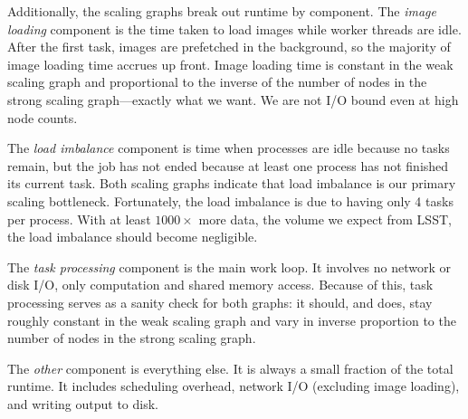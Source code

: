Additionally, the scaling graphs break out runtime by component.
The \textit{image loading} component is the time taken to load images while worker threads
are idle. After the first task, images are prefetched in the background, so the majority of image loading time accrues up front.
Image loading time is constant in the weak scaling graph and proportional to the inverse of the number of nodes in the strong scaling graph---exactly what we want. We are not I/O bound even at high node counts.

The \textit{load imbalance} component is time when processes are idle because no tasks remain, but the job has not ended because at least one process has not finished its current task.
Both scaling graphs indicate that load imbalance is our primary scaling bottleneck.
Fortunately, the load imbalance is due to having only 4 tasks per process.
With at least $1000\times$ more data, the volume we expect from LSST, the load imbalance should become negligible.

The \textit{task processing} component is the main work loop.
It involves no network or disk I/O, only computation and shared memory access.
Because of this, task processing serves as a sanity check for both graphs: it should, and does, stay roughly constant in the weak scaling graph and vary in inverse proportion to the number of nodes in the strong scaling graph.

The \textit{other} component is everything else. It is always a small fraction of the total runtime.
It includes scheduling overhead, network I/O (excluding image loading), and writing output to disk.

